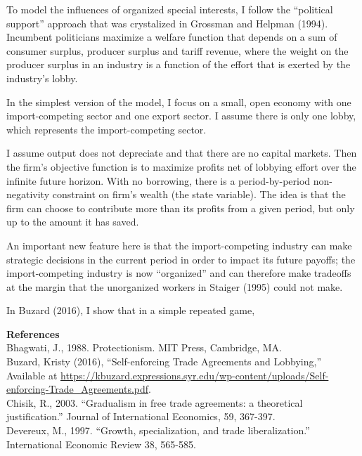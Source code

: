 \documentclass[12pt]{article}
\begin{document}
To model the influences of organized special interests, I follow the ``political support'' approach that was crystalized in Grossman and Helpman (1994). Incumbent politicians maximize a welfare function that depends on a sum of consumer surplus, producer surplus and tariff revenue, where the weight on the producer surplus in an industry is a function of the effort that is exerted by the industry's lobby. 

In the simplest version of the model, I focus on a small, open economy with one import-competing sector and one export sector. I assume there is only one lobby, which represents the import-competing sector. 

I assume output does not depreciate and that there are no capital markets. Then the firm's objective function is to maximize profits net of lobbying effort over the infinite future horizon. With no borrowing, there is a period-by-period non-negativity constraint on firm's wealth (the state variable). The idea is that the firm can choose to contribute more than its profits from a given period, but only up to the amount it has saved. 

An important new feature here is that the import-competing industry can make strategic decisions in the current period in order to impact its future payoffs; the import-competing industry is now ``organized'' and can therefore make tradeoffs at the margin that the unorganized workers in Staiger (1995) could not make.

In Buzard (2016), I show that in a simple repeated game,

				

\newpage
\noindent\large\textbf{References}\\

\noindent\normalsize Bhagwati, J., 1988. Protectionism. MIT Press, Cambridge, MA. \\

\noindent Buzard, Kristy (2016), ``Self-enforcing Trade Agreements and Lobbying,'' Available at \url{https://kbuzard.expressions.syr.edu/wp-content/uploads/Self-enforcing-Trade_Agreements.pdf}. \\

\noindent Chisik, R., 2003. ``Gradualism in free trade agreements: a theoretical justification.'' Journal of International Economics, 59, 367-397. \\

\noindent Devereux, M., 1997. ``Growth, specialization, and trade liberalization.'' International Economic Review
38, 565-585. \\
\end{document}

